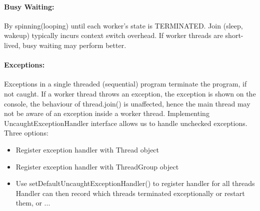 \documentclass[8pt]{extreport}
\begin{document}
\paragraph{Busy Waiting:}  By spinning(looping) until each worker's state is TERMINATED. Join (sleep, wakeup) typically incurs context switch overhead. If worker threads are short-lived, busy waiting may perform better.
\paragraph{Exceptions: } Exceptions in a single threaded (sequential) program terminate the program, if not caught. If a worker thread throws an exception, the exception is shown on the console, the behaviour of thread.join() is unaffected, hence the main thread may not be aware of an exception inside a worker thread. Implementing UncaughtExceptionHandler interface allows us to handle unchecked exceptions. Three options:
\begin{itemize}
\item Register exception handler with Thread object
\item Register exception handler with ThreadGroup object
\item Use setDefaultUncaughtExceptionHandler() to register handler for all threads
Handler can then record which threads terminated exceptionally or restart them, or ...
\end{itemize}
\end{document}
